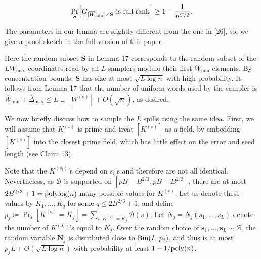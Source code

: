 \documentclass[10pt,a4paper]{article}
\begin{document}
\[\begin{gathered}
\Pr_{\boldsymbol{S}}\Bigl[\text{$G_{[\overline{W}_{\min}]\times\boldsymbol{S}}$ is full rank}\Bigr]\geq 1-\frac{1}{n^{C/2}}.
\end{gathered}\]






The parameters in our lemma are slightly different from the one in [26], so, we give a proof sketch in the full version of this paper.\par




Here the random subset $\boldsymbol{S}$ in Lemma 17 corresponds to the random subset of the $LW_{\max}$ coordinates read by all $L$ samplers modulo their first $W_{\min}$ elements.
By concentration bounds, $\boldsymbol{S}$ has size at most $\sqrt{L\log n}$ with high probability.
It follows from Lemma 17 that the number of uniform words used by the sampler is $\overline{W}_{\min}+\overline{\Delta}_{\max}\leq L\operatorname{\mathbb{E}}[W^{(\boldsymbol{s})}]+\widetilde{O}(\sqrt{n})$, as desired.\par




We now briefly discuss how to sample the $L$ spills using the same idea.
First, we will assume that $K^{(s)}$ is prime and treat $[K^{(s)}]$ as a field, by embedding $[K^{(s)}]$ into the closest prime field, which has little effect on the error and seed length (see Claim 13).\par




Note that the $K^{(s_{i})}$’s depend on $s_{i}$’s and therefore are not all identical.
Nevertheless, as $\mathcal{B}$ is supported on $[pB-B^{2/3},pB+B^{2/3}]$, there are at most $2B^{2/3}+1=\textnormal{polylog}(n)$ many possible values for $K^{(s)}$.
Let us denote these values by $K_{1},\ldots,K_{q}$ for some $q\leq 2B^{2/3}+1$, and define $p_{j}\coloneq\Pr_{\boldsymbol{s}}[K^{(\boldsymbol{s})}=K_{j}]=\sum_{s:K^{(s)}=K_{j}}\mathcal{B}(s)$.
Let $N_{j}=N_{j}(s_{1},\ldots,s_{L})$ denote the number of $K^{(s_{i})}$’s equal to $K_{j}$.
Over the random choice of $\boldsymbol{s}_{1},\ldots,\boldsymbol{s}_{L}\sim\mathcal{B}$, the random variable $\boldsymbol{N}_{j}$ is distributed close to $\textnormal{Bin}(L,p_{j})$, and thus is at most $p_{j}L+O(\sqrt{L\log n})$ with probability at least $1-1/\textnormal{poly}(n)$.\par
\end{document}
